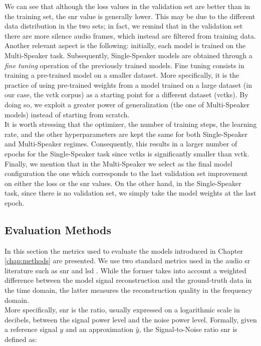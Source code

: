 \noindent We can see that although the loss values in the validation set are better than in the training set, the \gls{snr} value is generally lower. This may be due to the different data distribution in the two sets; in fact, we remind that in the validation set there are more silence audio frames, which instead are filtered from training data.\\
Another relevant aspect is the following: initially, each model is trained on the Multi-Speaker task. Subsequently, Single-Speaker models are obtained through a \textit{fine tuning} operation of the previously trained models. Fine tuning consists in training a pre-trained model on a smaller dataset. More specifically, it is the practice of using pre-trained weights from a model trained on a large dataset (in our case, the \gls{vctk} corpus) as a starting point for a different dataset (\gls{vctk}s). By doing so, we exploit a greater power of generalization (the one of Multi-Speaker models) instead of starting from scratch. \\
It is worth stressing that the optimizer, the number of training steps, the learning rate, and the other hyperparameters are kept the same for both Single-Speaker and Multi-Speaker regimes. Consequently, this results in a larger number of epochs for the Single-Speaker task since \gls{vctk}s is significantly smaller than \gls{vctk}. \\
Finally, we mention that in the Multi-Speaker we select as the final model configuration the one which corresponds to the last validation set improvement on either the loss or the \gls{snr} values. On the other hand, in the Single-Speaker task, since there is no validation set, we simply take the model weights at the last epoch.

\subsection{Evaluation Methods} \label{eval_methods}
In this section the metrics used to evaluate the models introduced in Chapter \ref{chap:methods} are presented. We use two standard metrics used in the audio \gls{sr} literature such as \gls{snr} and \gls{lsd} \cite{gray1976distance}. While the former takes into account a weighted difference between the model signal reconstruction and the ground-truth data in the time domain, the latter measures the reconstruction quality in the frequency domain. \\
More specifically, \gls{snr} is the ratio, usually expressed on a logarithmic scale in decibels, between the signal power level and the noise power level. Formally, given a reference signal $y$ and an approximation $\hat{y}$, the Signal-to-Noise ratio \gls{snr} is defined as:


